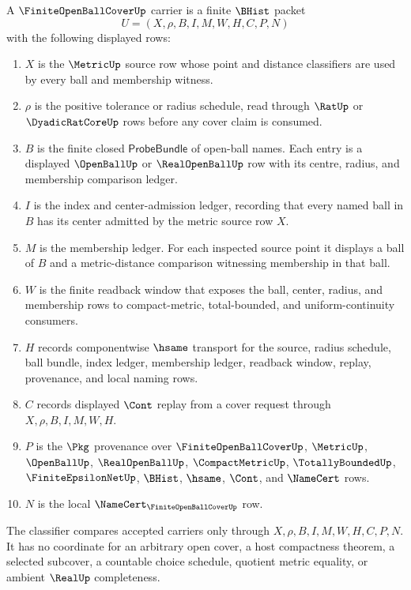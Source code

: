 \begin{definition}
\label{def:finite-open-ball-cover-carrier}
A $\FiniteOpenBallCoverUp$ carrier is a finite $\BHist$ packet
$$
U=(X,\rho,B,I,M,W,H,C,P,N)
$$
with the following displayed rows:
\begin{enumerate}
\item $X$ is the $\MetricUp$ source row whose point and distance classifiers are used by every ball and membership witness.
\item $\rho$ is the positive tolerance or radius schedule, read through $\RatUp$ or $\DyadicRatCoreUp$ rows before any cover claim is consumed.
\item $B$ is the finite closed $\mathsf{ProbeBundle}$ of open-ball names. Each entry is a displayed $\OpenBallUp$ or $\RealOpenBallUp$ row with its centre, radius, and membership comparison ledger.
\item $I$ is the index and center-admission ledger, recording that every named ball in $B$ has its center admitted by the metric source row $X$.
\item $M$ is the membership ledger. For each inspected source point it displays a ball of $B$ and a metric-distance comparison witnessing membership in that ball.
\item $W$ is the finite readback window that exposes the ball, center, radius, and membership rows to compact-metric, total-bounded, and uniform-continuity consumers.
\item $H$ records componentwise $\hsame$ transport for the source, radius schedule, ball bundle, index ledger, membership ledger, readback window, replay, provenance, and local naming rows.
\item $C$ records displayed $\Cont$ replay from a cover request through $X,\rho,B,I,M,W,H$.
\item $P$ is the $\Pkg$ provenance over $\FiniteOpenBallCoverUp$, $\MetricUp$, $\OpenBallUp$, $\RealOpenBallUp$, $\CompactMetricUp$, $\TotallyBoundedUp$, $\FiniteEpsilonNetUp$, $\BHist$, $\hsame$, $\Cont$, and $\NameCert$ rows.
\item $N$ is the local $\NameCert_{\FiniteOpenBallCoverUp}$ row.
\end{enumerate}
The classifier compares accepted carriers only through $X,\rho,B,I,M,W,H,C,P,N$. It has no coordinate for an arbitrary open cover, a host compactness theorem, a selected subcover, a countable choice schedule, quotient metric equality, or ambient $\RealUp$ completeness.
\end{definition}

